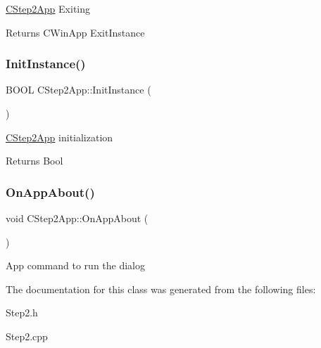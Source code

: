 \mbox{\hyperlink{class_c_step2_app}{C\+Step2\+App}} Exiting \begin{DoxyReturn}{Returns}
C\+Win\+App Exit\+Instance 
\end{DoxyReturn}
\mbox{\label{class_c_step2_app_a4152bf861e6e520eaa173c41a3d9f73d}} 
\subsubsection{\texorpdfstring{Init\+Instance()}{InitInstance()}}
{\footnotesize\ttfamily B\+O\+OL C\+Step2\+App\+::\+Init\+Instance (\begin{DoxyParamCaption}{ }\end{DoxyParamCaption})\hspace{0.3cm}{\ttfamily [virtual]}}

\mbox{\hyperlink{class_c_step2_app}{C\+Step2\+App}} initialization \begin{DoxyReturn}{Returns}
Bool 
\end{DoxyReturn}
\mbox{\label{class_c_step2_app_a7407f02b1d0628458512c9f35ab2bb50}} 
\subsubsection{\texorpdfstring{On\+App\+About()}{OnAppAbout()}}
{\footnotesize\ttfamily void C\+Step2\+App\+::\+On\+App\+About (\begin{DoxyParamCaption}{ }\end{DoxyParamCaption})}

App command to run the dialog 

The documentation for this class was generated from the following files\+:\begin{DoxyCompactItemize}
\item 
Step2.\+h\item 
Step2.\+cpp\end{DoxyCompactItemize}
